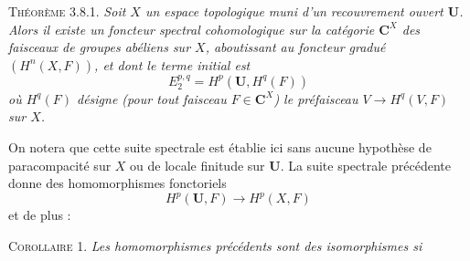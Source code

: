 \textsc{Théorème 3.8.1.} \textit{Soit $X$ un espace topologique
muni d'un recouvrement ouvert $\mathbf U$. Alors il existe un foncteur
spectral cohomologique sur la catégorie $\mathbf C^X$ des faisceaux de groupes
abéliens sur $X$, aboutissant au foncteur gradué $(H^n(X,F))$, et dont le
terme initial est}
\[
E_2^{p,q}=H^p(\mathbf U,H^q(F))
\]
\textit{où $H^q(F)$ désigne \textup{(}pour tout faisceau $F\in\mathbf C^X$\textup{)} le préfaisceau
$V\to H^q(V,F)$ sur $X$.}

On notera que cette suite spectrale est établie ici sans aucune hypothèse de
paracompacité sur $X$ ou de locale finitude sur $\mathbf U$. La suite
spectrale précédente donne des homomorphismes fonctoriels
\[
H^p(\mathbf U,F)\to H^p(X,F)
\]
et de plus :

\textsc{Corollaire 1.} \textit{Les homomorphismes précédents sont des
isomorphismes si}

